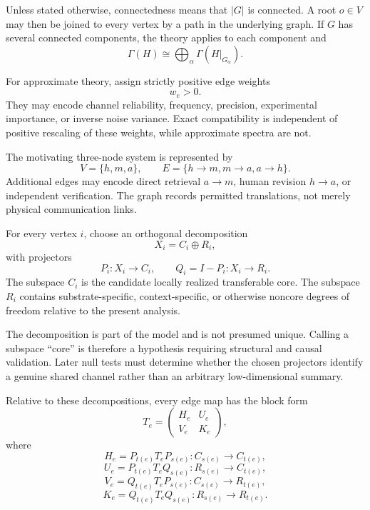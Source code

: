 
Unless stated otherwise, connectedness means that \(|G|\) is connected. A
root \(o\in V\) may then be joined to every vertex by a path in the underlying
graph. If \(G\) has several connected components, the theory applies to each
component and
\[
\Gamma(H)
\cong
\bigoplus_{\alpha}\Gamma(H|_{G_\alpha}).
\]


For approximate theory, assign strictly positive edge weights
\[
w_e>0.
\]
They may encode channel reliability, frequency, precision, experimental
importance, or inverse noise variance. Exact compatibility is independent of
positive rescaling of these weights, while approximate spectra are not.

\begin{example}\label{ex:hma-graph}
The motivating three-node system is represented by
\[
V=\{h,m,a\},
\qquad
E=\{h\to m,m\to a,a\to h\}.
\]
Additional edges may encode direct retrieval \(a\to m\), human revision
\(h\to a\), or independent verification. The graph records permitted
translations, not merely physical communication links.
\end{example}


\begin{definition}\label{def:core-residual}
For every vertex \(i\), choose an orthogonal decomposition
\[
X_i=C_i\oplus R_i,
\]
with projectors
\[
P_i:X_i\to C_i,
\qquad
Q_i=I-P_i:X_i\to R_i.
\]
The subspace \(C_i\) is the candidate locally realized transferable core. The
subspace \(R_i\) contains substrate-specific, context-specific, or otherwise
noncore degrees of freedom relative to the present analysis.
\end{definition}

The decomposition is part of the model and is not presumed unique. Calling a
subspace ``core'' is therefore a hypothesis requiring structural and causal
validation. Later null tests must determine whether the chosen projectors
identify a genuine shared channel rather than an arbitrary low-dimensional
summary.

Relative to these decompositions, every edge map has the block form
\[
T_e=
\begin{pmatrix}
H_e & U_e\\
V_e & K_e
\end{pmatrix},
\]
where
\[
H_e=P_{t(e)}T_eP_{s(e)}:C_{s(e)}\to C_{t(e)},
\]
\[
U_e=P_{t(e)}T_eQ_{s(e)}:R_{s(e)}\to C_{t(e)},
\]
\[
V_e=Q_{t(e)}T_eP_{s(e)}:C_{s(e)}\to R_{t(e)},
\]
\[
K_e=Q_{t(e)}T_eQ_{s(e)}:R_{s(e)}\to R_{t(e)}.
\]

